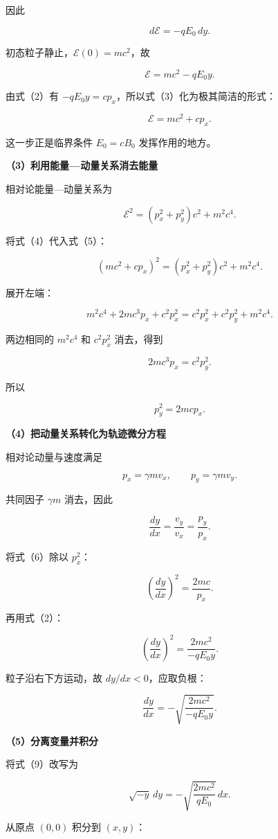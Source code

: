 \documentclass[12pt,a4paper,UTF8]{ctexart}
\begin{document}
因此

\[
d\mathcal E=-qE_0\,dy.
\]

初态粒子静止，\(\mathcal E(0)=mc^2\)，故

\[
\boxed{\mathcal E=mc^2-qE_0y}.
\tag{3}
\]

由式（2）有 \(-qE_0y=cp_x\)，所以式（3）化为极其简洁的形式：

\[
\boxed{\mathcal E=mc^2+cp_x}.
\tag{4}
\]

这一步正是临界条件 \(E_0=cB_0\) 发挥作用的地方。

\textbf{（3）利用能量---动量关系消去能量}

相对论能量---动量关系为

\[
\mathcal E^2=(p_x^2+p_y^2)c^2+m^2c^4.
\tag{5}
\]

将式（4）代入式（5）：

\[
(mc^2+cp_x)^2
=(p_x^2+p_y^2)c^2+m^2c^4.
\]

展开左端：

\[
m^2c^4+2mc^3p_x+c^2p_x^2
=c^2p_x^2+c^2p_y^2+m^2c^4.
\]

两边相同的 \(m^2c^4\) 和 \(c^2p_x^2\) 消去，得到

\[
2mc^3p_x=c^2p_y^2.
\]

所以

\[
\boxed{p_y^2=2mcp_x}.
\tag{6}
\]

\textbf{（4）把动量关系转化为轨迹微分方程}

相对论动量与速度满足

\[
p_x=\gamma mv_x,
\qquad
p_y=\gamma mv_y.
\]

共同因子 \(\gamma m\) 消去，因此

\[
\frac{dy}{dx}
=\frac{v_y}{v_x}
=\frac{p_y}{p_x}.
\tag{7}
\]

将式（6）除以 \(p_x^2\)：

\[
\left(\frac{dy}{dx}\right)^2
=\frac{2mc}{p_x}.
\]

再用式（2）：

\[
\left(\frac{dy}{dx}\right)^2
=\frac{2mc^2}{-qE_0y}.
\tag{8}
\]

粒子沿右下方运动，故 \(dy/dx<0\)，应取负根：

\[
\frac{dy}{dx}
=-\sqrt{\frac{2mc^2}{-qE_0y}}.
\tag{9}
\]

\textbf{（5）分离变量并积分}

将式（9）改写为

\[
\sqrt{-y}\,dy
=-\sqrt{\frac{2mc^2}{qE_0}}\,dx.
\tag{10}
\]

从原点 \((0,0)\) 积分到 \((x,y)\)：
\end{document}
